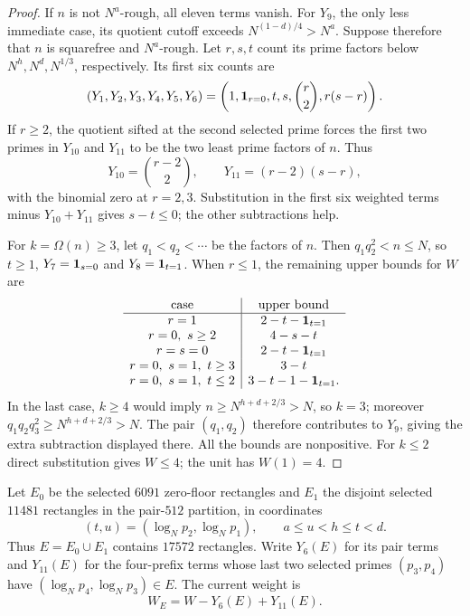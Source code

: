 \begin{proof}
If $n$ is not $N^a$-rough, all eleven terms vanish.  For $Y_9$, the
only less immediate case, its quotient cutoff exceeds
$N^{(1-d)/4}>N^a$.  Suppose therefore that $n$ is squarefree and
$N^a$-rough.  Let $r,s,t$ count its prime factors below $N^h,N^d,N^{1/3}$,
respectively.  Its first six counts are
\[
 (Y_1,Y_2,Y_3,Y_4,Y_5,Y_6)
      =\left(1,{\bf1}_{r=0},t,s,\binom r2,r(s-r)\right).
\]
If $r\ge2$, the quotient sifted at the second selected prime forces
the first two primes in $Y_{10}$ and $Y_{11}$ to be the two least
prime factors of $n$.  Thus
\[
 Y_{10}=\binom{r-2}{2},\qquad Y_{11}=(r-2)(s-r),
\]
with the binomial zero at $r=2,3$.  Substitution in the first six
weighted terms minus $Y_{10}+Y_{11}$ gives $s-t\le0$; the other
subtractions help.

For $k=\Omega(n)\ge3$, let $q_1<q_2<\cdots$ be the factors of $n$.
Then $q_1q_2^2<n\le N$, so $t\ge1$,
$Y_7={\bf1}_{s=0}$ and $Y_8={\bf1}_{t=1}$.
When $r\le1$, the remaining upper bounds for $W$ are
\[
\begin{array}{c|c}
 \text{case}&\text{upper bound}\\ \hline
 r=1&2-t-{\bf1}_{t=1}\\
 r=0,\ s\ge2&4-s-t\\
 r=s=0&2-t-{\bf1}_{t=1}\\
 r=0,\ s=1,\ t\ge3&3-t\\
 r=0,\ s=1,\ t\le2&3-t-1-{\bf1}_{t=1}.
\end{array}
\]
In the last case, $k\ge4$ would imply
$n\ge N^{h+d+2/3}>N$, so $k=3$; moreover
$q_1q_2q_3^2\ge N^{h+d+2/3}>N$.  The pair $(q_1,q_2)$ therefore
contributes to $Y_9$, giving the extra subtraction displayed there.
All the bounds are nonpositive.  For $k\le2$ direct substitution
gives $W\le4$; the unit has $W(1)=4$.
\end{proof}

Let $E_0$ be the selected $6091$ zero-floor rectangles and $E_1$ the
disjoint selected $11481$ rectangles in the pair-$512$ partition,
in coordinates
\[
 (t,u)=(\log_Np_2,\log_Np_1),\qquad a\le u<h\le t<d.
\]
Thus $E=E_0\cup E_1$ contains $17572$ rectangles.  Write $Y_6(E)$
for its pair terms and $Y_{11}(E)$ for the four-prefix terms whose
last two selected primes $(p_3,p_4)$ have
$(\log_Np_4,\log_Np_3)\in E$.  The current weight is
\begin{equation}
                         W_E=W-Y_6(E)+Y_{11}(E).
 \label{eq:current-paired-weight}
\end{equation}

